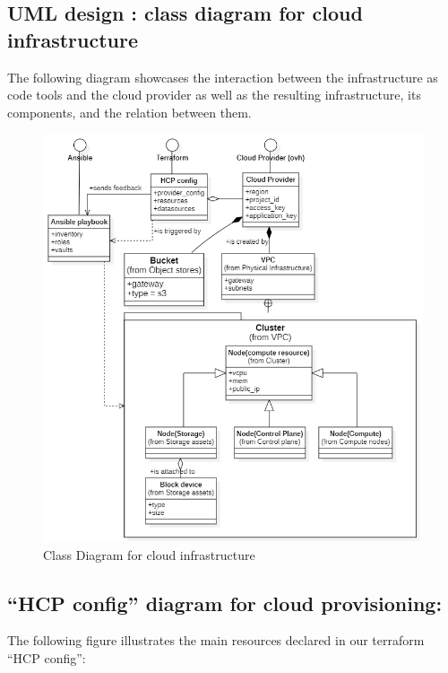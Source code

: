 \subsection{UML design : class diagram for cloud infrastructure }
The following diagram showcases the interaction between the infrastructure as code tools and the cloud provider as well as the resulting infrastructure, its components, and the relation between them. 
\begin{figure}[H]\centering
\includegraphics[width=1.0\textwidth,angle=00]{assets/f13.png}
\caption{Class Diagram for cloud infrastructure}
\label{fig:fig13}
\end{figure}

\subsection{“HCP config” diagram for cloud provisioning: }
The following figure illustrates the main resources declared in our terraform “HCP config”: 

